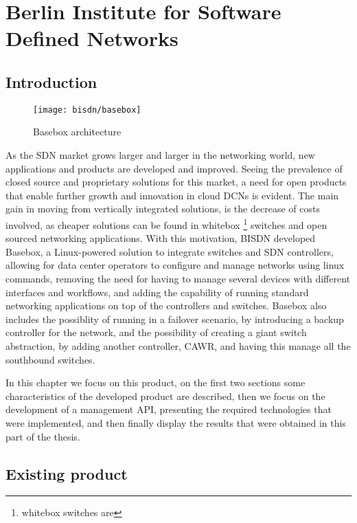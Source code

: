 \chapter {Berlin Institute for Software Defined Networks} \label{chap:bisdn} %

\section {Introduction}

\begin{figure} [!htbp]
    \texttt{[image: bisdn/basebox]}
    \caption{Basebox architecture}
\end{figure}

As the SDN market grows larger and larger in the networking world, new applications and products are developed and improved. Seeing the prevalence of closed source and proprietary solutions for this market, a need for open
products that enable further growth and innovation in cloud DCNs is evident. The main gain in moving from vertically integrated solutions, is the decrease of costs involved, as cheaper solutions can be found in whitebox 
\footnote {whitebox switches are} switches and open sourced networking applications. With this motivation, BISDN developed Basebox, a Linux-powered solution to integrate switches and SDN controllers, allowing for data center 
operators to configure and manage networks using linux commands, removing the need for having to manage several devices with different interfaces and workflows, and adding the capability of running standard networking applications 
on top of the controllers and switches. Basebox also includes the possiblity of running in a failover scenario, by introducing a backup controller for the network, and the possibility of creating a giant switch abstraction, 
by adding another controller, CAWR, and having this manage all the southbound switches.

\par In this chapter we focus on this product, on the first two sections some characteristics of the developed product are described, then we focus on the development of a management API, presenting the required technologies that 
were implemented, and then finally display the results that were obtained in this part of the thesis.

\section {Existing product}


